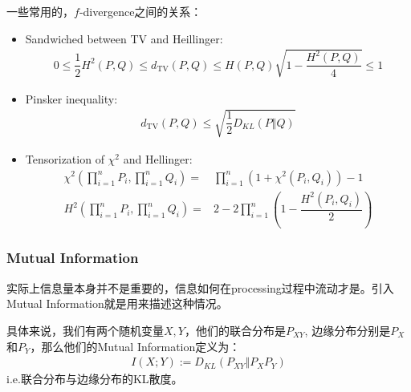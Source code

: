 \documentclass[11pt,a4paper]{ctexart}
\numberwithin{equation}{section}%
\begin{document}
一些常用的，$ f $-divergence之间的关系：
\begin{itemize}[topsep=2pt,itemsep=0pt]
    \item Sandwiched between TV and Heillinger:
    \begin{align*}
        0\leq \dfrac{ 1 }{ 2  } H^2(P,Q)\leq d_\mathrm{ TV }(P,Q)\leq H(P,Q)\sqrt{1-\dfrac{ H^2(P,Q) }{ 4 } } \leq 1  
    \end{align*}
    \item Pinsker inequality:
    \begin{align*}
        d_\mathrm{ TV }(P,Q)\leq \sqrt{ \dfrac{ 1 }{ 2 } D_{KL}(P\Vert Q) } 
    \end{align*}
    
    
    \item Tensorization of $ \chi^2 $ and Hellinger:
    \begin{align*}
        \chi^2(\prod_{i=1}^n P_i,\prod_{i=1}^n Q_i) = & \prod_{i=1}^n \left( 1 + \chi^2(P_i,Q_i) \right) -1 \\
        H^2(\prod_{i=1}^n P_i,\prod_{i=1}^n Q_i) = & 2-2\prod_{i=1}^n \left( 1- \dfrac{ H^2(P_i,Q_i) }{ 2 } \right) 
    \end{align*}
    
    
    
\end{itemize}


\subsubsection{Mutual Information}

实际上信息量本身并不是重要的，信息如何在processing过程中流动才是。引入Mutual Information就是用来描述这种情况。

具体来说，我们有两个随机变量$ X,Y $，他们的联合分布是$ P_{XY}$, 边缘分布分别是$ P_X $和$ P_Y $，那么他们的Mutual Information定义为：
\begin{align*}
    I(X;Y):= D_{KL}(P_{XY}\Vert P_XP_Y) 
\end{align*}
i.e.联合分布与边缘分布的KL散度。
\end{document}
